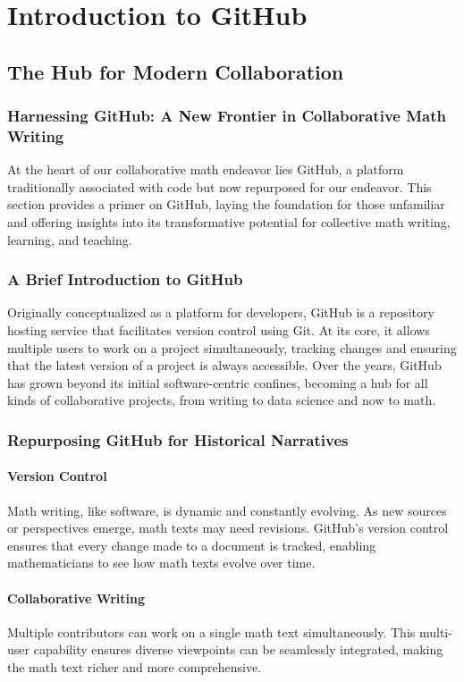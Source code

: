 \documentclass[a4paper,12pt]{book}
\begin{document}
\chapter{Introduction to GitHub}
\section*{The Hub for Modern Collaboration}
\subsection*{Harnessing GitHub: A New Frontier in Collaborative Math Writing}
At the heart of our collaborative math endeavor lies GitHub, a platform traditionally associated with code but now repurposed for our endeavor. This section provides a primer on GitHub, laying the foundation for those unfamiliar and offering insights into its transformative potential for collective math writing, learning, and teaching.

\subsection*{A Brief Introduction to GitHub}
Originally conceptualized as a platform for developers, GitHub is a repository hosting service that facilitates version control using Git. At its core, it allows multiple users to work on a project simultaneously, tracking changes and ensuring that the latest version of a project is always accessible. Over the years, GitHub has grown beyond its initial software-centric confines, becoming a hub for all kinds of collaborative projects, from writing to data science and now to math.

\subsection*{Repurposing GitHub for Historical Narratives}
\subsubsection*{Version Control}
Math writing, like software, is dynamic and constantly evolving. As new sources or perspectives emerge, math texts may need revisions. GitHub's version control ensures that every change made to a document is tracked, enabling mathematicians to see how math texts evolve over time.

\subsubsection*{Collaborative Writing}
Multiple contributors can work on a single math text simultaneously. This multi-user capability ensures diverse viewpoints can be seamlessly integrated, making the math text richer and more comprehensive.
\end{document}
